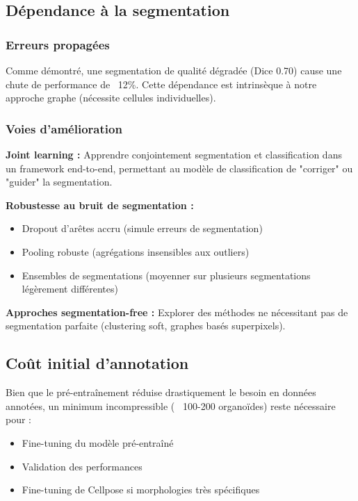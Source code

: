 \subsection{Dépendance à la segmentation}

\subsubsection{Erreurs propagées}

Comme démontré, une segmentation de qualité dégradée (Dice 0.70) cause une chute de performance de ~12\%. Cette dépendance est intrinsèque à notre approche graphe (nécessite cellules individuelles).

\subsubsection{Voies d'amélioration}

\textbf{Joint learning :}
Apprendre conjointement segmentation et classification dans un framework end-to-end, permettant au modèle de classification de "corriger" ou "guider" la segmentation.

\textbf{Robustesse au bruit de segmentation :}
\begin{itemize}
    \item Dropout d'arêtes accru (simule erreurs de segmentation)
    \item Pooling robuste (agrégations insensibles aux outliers)
    \item Ensembles de segmentations (moyenner sur plusieurs segmentations légèrement différentes)
\end{itemize}

\textbf{Approches segmentation-free :}
Explorer des méthodes ne nécessitant pas de segmentation parfaite (clustering soft, graphes basés superpixels).

\subsection{Coût initial d'annotation}

Bien que le pré-entraînement réduise drastiquement le besoin en données annotées, un minimum incompressible (~ 100-200 organoïdes) reste nécessaire pour :
\begin{itemize}
    \item Fine-tuning du modèle pré-entraîné
    \item Validation des performances
    \item Fine-tuning de Cellpose si morphologies très spécifiques
\end{itemize}

